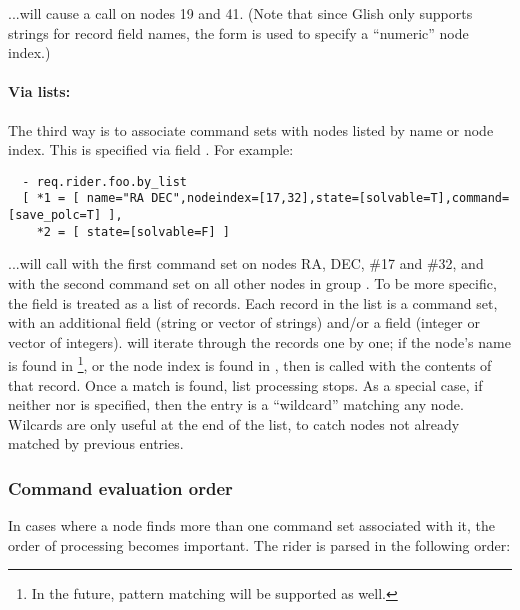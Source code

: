 \documentclass[10pt]{article}
\begin{document}
  ...will cause a  call on nodes 19 and 41. (Note that
  since Glish only supports strings for record field names, the 
  form is used to specify a ``numeric'' node index.)

  \paragraph{Via lists:} The third way is to associate command sets with nodes
  listed by name or node index. This is specified via field
  . For example:

\begin{verbatim}
  - req.rider.foo.by_list
  [ *1 = [ name="RA DEC",nodeindex=[17,32],state=[solvable=T],command=[save_polc=T] ],
    *2 = [ state=[solvable=F] ]
\end{verbatim}

  ...will call  with the first command set on nodes RA,
  DEC, \#17 and \#32, and with the second command set on all other nodes in
  group . To be more specific, the  field is
  treated as a list  of records. Each record in the list is a command set, with
  an additional  field (string or vector of strings) and/or a
   field (integer or vector of integers). 
  will iterate through the records one by one; if the node's name is found in
  \footnote{In the future, pattern matching will be supported as
  well.}, or the node index is found in , then
   is called with the contents of that record. Once a
  match is found, list processing stops. As a special case, if neither
   nor  is specified, then the entry is a ``wildcard''
  matching any node. Wilcards are only useful at the end of the list, to catch
  nodes not already matched by previous entries.
  
\subsubsection{Command evaluation order}

  In cases where a node finds more than one command set associated with it, the
  order of processing becomes important. The rider is parsed in the following
  order:
\end{document}
